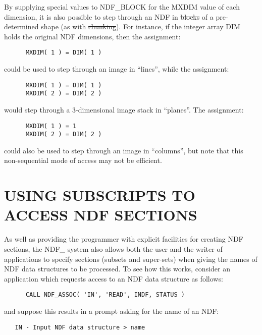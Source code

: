 By supplying special values to NDF\_BLOCK for the MXDIM value of each
dimension, it is also possible to step through an NDF in \st{blocks\/}
of a pre-determined shape (as with \st{chunking\/}). For instance, if
the integer array DIM holds the original NDF dimensions, then the
assignment:

\small
\begin{verbatim}
      MXDIM( 1 ) = DIM( 1 )
\end{verbatim}
\normalsize

could be used to step through an image in ``lines'', while the
assignment:

\small
\begin{verbatim}
      MXDIM( 1 ) = DIM( 1 )
      MXDIM( 2 ) = DIM( 2 )
\end{verbatim}
\normalsize

would step through a 3-dimensional image stack in ``planes''. The assignment:

\small
\begin{verbatim}
      MXDIM( 1 ) = 1
      MXDIM( 2 ) = DIM( 2 )
\end{verbatim}
\normalsize

could also be used to step through an image in ``columns'', but note
that this non-sequential mode of access may not be efficient.


\section{\label{ss:sectionsbyname}USING SUBSCRIPTS TO ACCESS NDF SECTIONS}

As well as providing the programmer with explicit facilities for
creating NDF sections, the NDF\_ system also allows both the user and
the writer of applications to specify sections (subsets and
super-sets) when giving the names of NDF data structures to be
processed. To see how this works, consider an application which
requests access to an NDF data structure as follows:

\small
\begin{verbatim}
      CALL NDF_ASSOC( 'IN', 'READ', INDF, STATUS )
\end{verbatim}
\normalsize

and suppose this results in a prompt asking for the name of an NDF:

\small
\begin{verbatim}
   IN - Input NDF data structure > name
\end{verbatim}
\normalsize

